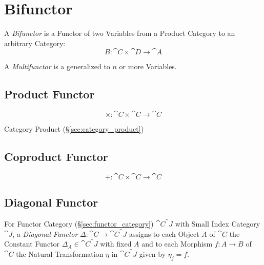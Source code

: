 \section{Bifunctor}\label{sec:bifunctor}

A \emph{Bifunctor} is a Functor of two Variables from a Product
Category to an arbitrary Category:
\[
  B : \cat{C} \times \cat{D} \rightarrow \cat{A}
\]

A \emph{Multifunctor} is a generalized to $n$ or more Variables.



\subsection{Product Functor}\label{sec:product_functor}

\[
  \times : \cat{C} \times \cat{C} \rightarrow \cat{C}
\]

Category Product (\S\ref{sec:category_product})



\subsection{Coproduct Functor}\label{sec:coproduct_functor}

\[
  + : \cat{C} \times \cat{C} \rightarrow \cat{C}
\]



\subsection{Diagonal Functor}\label{sec:diagonal_functor}

For Functor Category (\S\ref{sec:functor_category})
$\cat{C}^\cat{J}$ with Small Index Category $\cat{J}$, a
\emph{Diagonal Functor} $\Delta : \cat{C} \rightarrow
\cat{C}^\cat{J}$ assigns to each Object $A$ of $\cat{C}$ the
Constant Functor $\Delta_A \in \cat{C}^\cat{J}$ with fixed $A$
and to each Morphism $f : A \rightarrow B$ of $\cat{C}$ the Natural
Transformation $\eta$ in $\cat{C}^\cat{J}$ given by $\eta_j =
f$.


